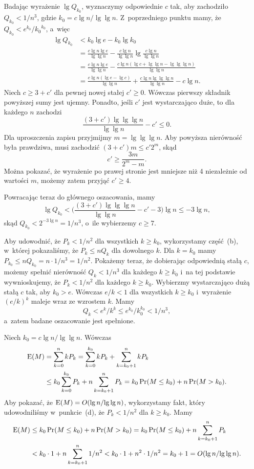 \subproblem %

\noindent Badając wyrażenie $\lg Q_{k_0}$, wyznaczymy odpowiednie $c$ tak, aby zachodziło $Q_{k_0}<1/n^3$, gdzie $k_0=c\lg n/\!\lg\lg n$. Z~poprzedniego punktu mamy, że $Q_{k_0}<e^{k_0}\!/{k_0}^{k_0}$, a~więc
\begin{align*}
	\lg Q_{k_0} &< k_0\lg e-k_0\lg k_0 \\
	&= \frac{c\lg n\lg e}{\lg\lg n}-\frac{c\lg n}{\lg\lg n}\lg\frac{c\lg n}{\lg\lg n} \\[1mm]
	&= \frac{c\lg n\lg e}{\lg\lg n}-\frac{c\lg n(\lg c+\lg\lg n-\lg\lg\lg n)}{\lg\lg n} \\[1mm]
	&= \frac{c\lg n(\lg e-\lg c)}{\lg\lg n}+\frac{c\lg n\lg\lg\lg n}{\lg\lg n}-c\lg n.
\end{align*}
Niech $c\ge3+c'$ dla pewnej nowej stałej $c'\ge0$. Wówczas pierwszy składnik powyższej sumy jest ujemny. Ponadto, jeśli $c'$ jest wystarczająco duże, to dla każdego $n$ zachodzi
\[
	\frac{(3+c')\lg\lg\lg n}{\lg\lg n}-c' \le 0.
\]
Dla uproszczenia zapisu przyjmijmy $m=\lg\lg\lg n$. Aby powyższa nierówność była prawdziwa, musi zachodzić $(3+c')m\le c'2^m$, skąd
\[
	c' \ge \frac{3m}{2^m-m}.
\]
Można pokazać, że wyrażenie po prawej stronie jest mniejsze niż 4 niezależnie od wartości $m$, możemy zatem przyjąć $c'\ge4$.

Powracając teraz do głównego oszacowania, mamy
\[
	\lg Q_{k_0} < \biggl(\frac{(3+c')\lg\lg\lg n}{\lg\lg n}-c'-3\biggr)\lg n \le -3\lg n,
\]
skąd $Q_{k_0}<2^{-3\lg n}=1/n^3$, o~ile wybierzemy $c\ge7$.

Aby udowodnić, że $P_k<1/n^2$ dla wszystkich $k\ge k_0$, wykorzystamy część~(b), w~której pokazaliśmy, że $P_k\le nQ_k$ dla dowolnego $k$. Dla $k=k_0$ mamy $P_{k_0}\le nQ_{k_0}=n\cdot1/n^3=1/n^2$. Pokażemy teraz, że dobierając odpowiednią stałą $c$, możemy spełnić nierówność $Q_k<1/n^3$ dla każdego $k\ge k_0$ i~na tej podstawie wywnioskujemy, że $P_k<1/n^2$ dla każdego $k\ge k_0$. Wybierzmy wystarczająco dużą stałą $c$ tak, aby $k_0>e$. Wówczas $e/k<1$ dla wszystkich $k\ge k_0$ i~wyrażenie $(e/k)^k$ maleje wraz ze wzrostem $k$. Mamy
\[
	Q_k < e^k\!/k^k \le e^{k_0}\!/k_0^{k_0} < 1/n^3,
\]
a~zatem badane oszacowanie jest spełnione.

\subproblem %
Niech $k_0=c\lg n/\!\lg\lg n$. Wówczas
\begin{align*}
	\operatorname{E}(M) &= \sum_{k=0}^nkP_k = \sum_{k=0}^{k_0}kP_k+\sum_{k=k_0+1}^nkP_k \\
	&\le k_0\sum_{k=0}^{k_0}P_k+n\sum_{k=k_0+1}^nP_k = k_0\Pr(M\le k_0)+n\Pr(M>k_0).
\end{align*}
Aby pokazać, że $\operatorname{E}(M)=O(\lg n/\!\lg\lg n)$, wykorzystamy fakt, który udowodniliśmy w~punkcie~(d), że $P_k<1/n^2$ dla $k\ge k_0$. Mamy
\begin{align*}
	\operatorname{E}(M) &\le k_0\Pr(M\le k_0)+n\Pr(M>k_0) = k_0\Pr(M\le k_0)+n\sum_{k=k_0+1}^nP_k \\
	&< k_0\cdot1+n\sum_{k=k_0+1}^n1/n^2 < k_0\cdot1+n^2\cdot1/n^2 = k_0+1 = O(\lg n/\!\lg\lg n).
\end{align*}

